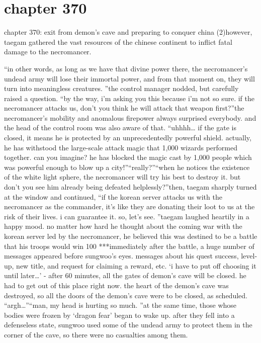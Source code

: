 \section{chapter 370}

chapter 370: exit from demon’s cave and preparing to conquer china (2)however, taegam gathered the vast resources of the chinese continent to inflict fatal damage to the necromancer.





“in other words, as long as we have that divine power there, the necromancer’s undead army will lose their immortal power, and from that moment on, they will turn into meaningless creatures.
”the control manager nodded, but carefully raised a question.
“by the way, i’m asking you this because i’m not so sure.
 if the necromancer attacks us, don’t you think he will attack that weapon first?”the necromancer’s mobility and anomalous firepower always surprised everybody.
 and the head of the control room was also aware of that.
“uhhhh… if the gate is closed, it means he is protected by an unprecedentedly powerful shield.
 actually, he has withstood the large-scale attack magic that 1,000 wizards performed together.
 can you imagine? he has blocked the magic cast by 1,000 people which was powerful enough to blow up a city!”“really?”“when he notices the existence of the white light sphere, the necromancer will try his best to destroy it.
 but don’t you see him already being defeated helplessly?”then, taegam sharply turned at the window and continued, “if the korean server attacks us with the necromancer as the commander, it’s like they are donating their loot to us at the risk of their lives.
 i can guarantee it.
 so, let’s see.
”taegam laughed heartily in a happy mood.
 no matter how hard he thought about the coming war with the korean server led by the necromancer, he believed this was destined to be a battle that his troops would win 100%
***immediately after the battle, a huge number of messages appeared before sungwoo’s eyes.
messages about his quest success, level-up, new title, and request for claiming a reward, etc.
‘i have to put off choosing it until later…’
- after 60 minutes, all the gates of demon’s cave will be closed.
he had to get out of this place right now.
 the heart of the demon’s cave was destroyed, so all the doors of the demon’s cave were to be closed, as scheduled.
“argh…”“man, my head is hurting so much.
”at the same time, those whose bodies were frozen by ‘dragon fear’ began to wake up.
after they fell into a defenseless state, sungwoo used some of the undead army to protect them in the corner of the cave, so there were no casualties among them.
